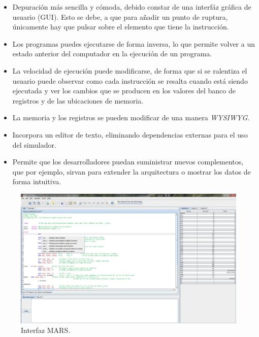 \begin{itemize}

\item Depuración más sencilla y cómoda, debido constar de una interfáz gráfica de usuario (GUI). Esto se debe, a que para añadir un punto de ruptura, únicamente hay que pulsar sobre el elemento que tiene la instrucción.

\item Los programas puedes ejecutarse de forma inversa, lo que permite volver a un estado anterior del computador en la ejecución de un programa.

\item La velocidad de ejecución puede modificarse, de forma que si se ralentiza el usuario puede observar como cada instrucción se resalta cuando está siendo ejecutada y ver los cambios que se producen en los valores del banco de registros y de las ubicaciones de memoria.

\item  La memoria y los registros se pueden modificar de una manera \emph{WYSIWYG}.

\item Incorpora un editor de texto, eliminando dependencias externas para el uso del simulador.

\item Permite que los desarrolladores puedan suministrar nuevos complementos, que por ejemplo, sirvan para extender la arquitectura o mostrar los datos de forma intuitiva.

\end{itemize}

\begin{figure}[htbp]
 	\centering
 	\includegraphics[width=14cm]{figures/mars_figure}
 	\caption{Interfaz MARS.}
	\label{fig:mars_figure}
\end{figure}

